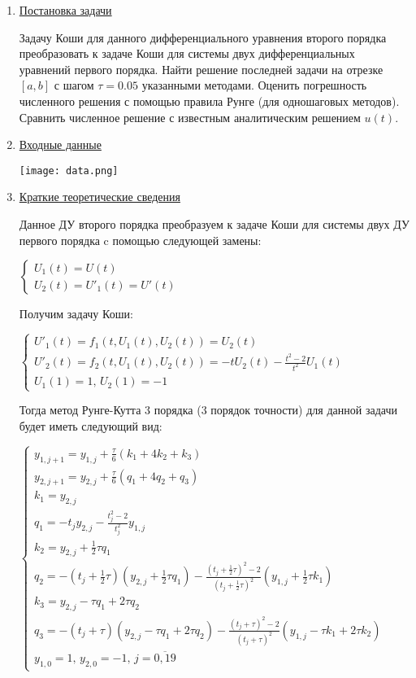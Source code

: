 \documentclass{article}%
\begin{document}
\begin{enumerate}%
\item%
\underline{Постановка задачи}

Задачу Коши для данного дифференциального уравнения второго порядка преобразовать к задаче Коши для системы двух дифференциальных уравнений первого порядка. Найти решение последней задачи на отрезке $[a, b]$ с шагом $\tau = 0.05$ указанными методами. Оценить погрешность численного решения с помощью правила Рунге (для одношаговых методов). Сравнить численное решение с известным аналитическим решением $u(t)$.

\item%
\underline{Входные данные}

\texttt{[image: data.png]}

\item%
\underline{Краткие теоретические сведения}

Данное ДУ второго порядка преобразуем к задаче Коши для системы двух ДУ первого порядка c помощью следующей замены:

$\begin{cases} 
U_1(t) = U(t) \\ U_2(t) = U'_1(t) = U'(t) 
\end{cases}$

Получим задачу Коши:

$\begin{cases} 
U'_1(t) = f_1(t, U_1(t), U_2(t)) = U_2(t) \\ U'_2(t) = f_2(t, U_1(t), U_2(t)) = -t U_2(t) - \frac{t^2-2}{t^2} U_1(t) \\ U_1(1) = 1,\,  U_2(1)=-1
\end{cases}$

\vskip 0.2in

Тогда метод Рунге-Кутта 3 порядка (3 порядок точности) для данной задачи будет иметь следующий вид:

$\begin{cases} 
y_{1,j+1} =  y_{1,j} + \frac{\tau}{6} (k_1 +4k_2+k_3) \\ y_{2,j+1} =  y_{2,j} + \frac{\tau}{6} (q_1 +4q_2+q_3) \\ k_1 = y_{2,j} \\ q_1 = -t_j y_{2,j} -  \frac{t_j^2-2}{t_j^2}   y_{1,j} \\
k_2 =  y_{2,j} + \frac{1}{2} \tau q_1 \\ q_2 = -(t_j + \frac{1}{2} \tau)(y_{2,j} + \frac{1}{2} \tau q_1) -  \frac{(t_j+ \frac{1}{2} \tau)^2-2}{(t_j+ \frac{1}{2} \tau)^2}  (y_{1,j} + \frac{1}{2} \tau k_1) \\
k_3 =  y_{2,j} - \tau q_1 + 2\tau q_2 \\ q_3 = -(t_j + \tau)( y_{2,j} - \tau q_1 + 2\tau q_2) -  \frac{(t_j+ \tau)^2-2}{(t_j+ \tau)^2}  (y_{1,j} - \tau k_1 + 2\tau k_2) \\ y_{1,0} = 1, \, y_{2,0} = -1, \, j = \overline{0,19}
\end{cases}$


\end{enumerate}
\end{document}
